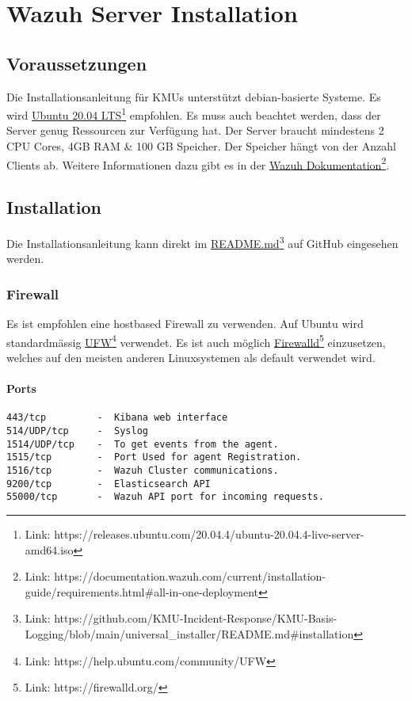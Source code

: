 \chapter{Wazuh Server Installation}

\section{Voraussetzungen}
Die Installationsanleitung für KMUs unterstützt debian-basierte Systeme.
Es wird \href{https://releases.ubuntu.com/20.04.4/ubuntu-20.04.4-live-server-amd64.iso}{Ubuntu 20.04 LTS}\footnote{Link: https://releases.ubuntu.com/20.04.4/ubuntu-20.04.4-live-server-amd64.iso} empfohlen.
Es muss auch beachtet werden, dass der Server genug Ressourcen zur Verfügung hat.
Der Server braucht mindestens 2 CPU Cores, 4GB RAM \& 100 GB Speicher.
Der Speicher hängt von der Anzahl Clients ab.
Weitere Informationen dazu gibt es in der \href{https://documentation.wazuh.com/current/installation-guide/requirements.html\#all-in-one-deployment}{Wazuh Dokumentation}\footnote{Link: https://documentation.wazuh.com/current/installation-guide/requirements.html\#all-in-one-deployment}.

\section{Installation}
Die Installationsanleitung kann direkt im \href{https://github.com/KMU-Incident-Response/KMU-Basis-Logging/blob/main/universal\_installer/README.md\#installation}{README.md}\footnote{Link: https://github.com/KMU-Incident-Response/KMU-Basis-Logging/blob/main/universal\_installer/README.md\#installation} auf GitHub eingesehen werden.


\subsection{Firewall}
Es ist empfohlen eine hostbased Firewall zu verwenden.
Auf Ubuntu wird standardmässig \href{https://help.ubuntu.com/community/UFW}{UFW}\footnote{Link: https://help.ubuntu.com/community/UFW} verwendet.
Es ist auch möglich \href{https://firewalld.org/}{Firewalld}\footnote{Link: https://firewalld.org/} einzusetzen, welches auf den meisten anderen Linuxsystemen als default verwendet wird.

\subsubsection{Ports}
\begin{lstlisting}
443/tcp         -  Kibana web interface
514/UDP/tcp     -  Syslog
1514/UDP/tcp    -  To get events from the agent.
1515/tcp        -  Port Used for agent Registration.
1516/tcp        -  Wazuh Cluster communications.
9200/tcp        -  Elasticsearch API
55000/tcp       -  Wazuh API port for incoming requests.
\end{lstlisting}




